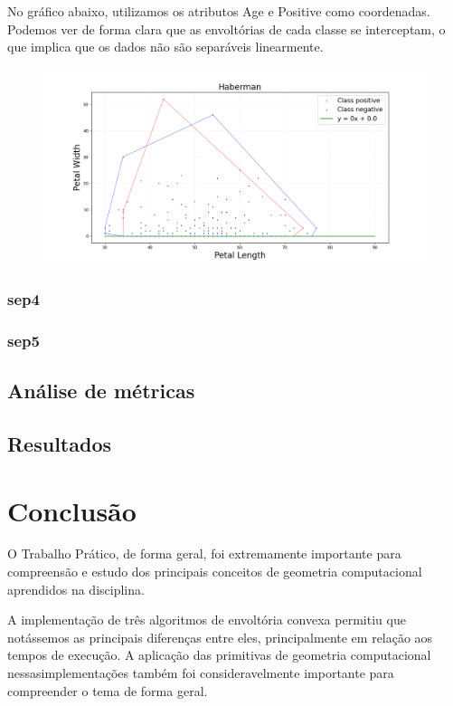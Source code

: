 \documentclass{article}
\begin{document}
No gráfico abaixo, utilizamos os atributos Age e Positive como coordenadas. Podemos ver de forma clara que as envoltórias de cada classe se interceptam, o que implica que os dados não são separáveis linearmente.

\begin{figure} [H]
	\includegraphics[width=12cm]{haberman.png}
	\centering
\end{figure}

\subsubsection{sep4}

\subsubsection{sep5}

\subsection{Análise de métricas}

\subsection{Resultados}

\section{Conclusão}

O Trabalho Prático, de forma geral, foi extremamente importante para compreensão e estudo dos principais conceitos de geometria computacional aprendidos na disciplina.

A implementação de três algoritmos de envoltória convexa permitiu que notássemos as principais diferenças entre eles, principalmente em relação aos tempos de execução. A aplicação das primitivas de geometria computacional nessasimplementações também foi consideravelmente importante para compreender o tema de forma geral.
\end{document}
